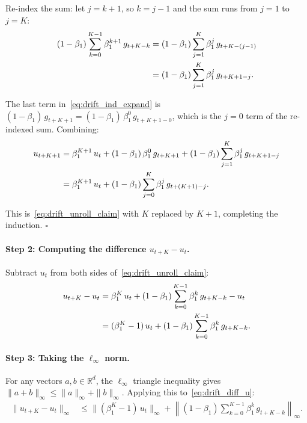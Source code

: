 \documentclass{article}
\begin{document}
Re-index the sum: let $j = k + 1$, so $k = j - 1$ and the sum runs
from $j = 1$ to $j = K$:
\begin{align}
(1-\beta_1)\sum_{k=0}^{K-1}\beta_1^{k+1}\,g_{t+K-k}
&= (1-\beta_1)\sum_{j=1}^{K}\beta_1^{j}\,g_{t+K-(j-1)} \notag \\
&= (1-\beta_1)\sum_{j=1}^{K}\beta_1^{j}\,g_{t+K+1-j}.
\label{eq:drift_reindex}
\end{align}

The last term in~\eqref{eq:drift_ind_expand} is
$(1-\beta_1)\,g_{t+K+1} = (1-\beta_1)\,\beta_1^0\,g_{t+K+1-0}$,
which is the $j = 0$ term of the re-indexed sum. Combining:
\begin{align}
u_{t+K+1}
&= \beta_1^{K+1}\,u_t
   + (1-\beta_1)\,\beta_1^0\,g_{t+K+1}
   + (1-\beta_1)\sum_{j=1}^{K}\beta_1^{j}\,g_{t+K+1-j} \notag \\
&= \beta_1^{K+1}\,u_t
   + (1-\beta_1)\sum_{j=0}^{K}\beta_1^{j}\,g_{t+(K+1)-j}.
\label{eq:drift_ind_done}
\end{align}

This is~\eqref{eq:drift_unroll_claim} with $K$ replaced by $K+1$,
completing the induction. \hfill$\square$

\paragraph{Step 2: Computing the difference $u_{t+K} - u_t$.}

Subtract $u_t$ from both sides of~\eqref{eq:drift_unroll_claim}:
\begin{align}
u_{t+K} - u_t
&= \beta_1^K\,u_t + (1-\beta_1)\sum_{k=0}^{K-1}\beta_1^k\,g_{t+K-k}
   - u_t \notag \\
&= (\beta_1^K - 1)\,u_t
   + (1-\beta_1)\sum_{k=0}^{K-1}\beta_1^k\,g_{t+K-k}.
\label{eq:drift_diff_u}
\end{align}

\paragraph{Step 3: Taking the $\ell_\infty$ norm.}

For any vectors $a, b \in \mathbb{R}^d$, the $\ell_\infty$ triangle
inequality gives $\|a + b\|_\infty \leq \|a\|_\infty + \|b\|_\infty$.
Applying this to~\eqref{eq:drift_diff_u}:
\begin{align}
\|u_{t+K} - u_t\|_\infty
&\leq \|(\beta_1^K - 1)\,u_t\|_\infty
   + \left\|(1-\beta_1)\sum_{k=0}^{K-1}\beta_1^k\,g_{t+K-k}\right\|_\infty.
\label{eq:drift_triangle_raw}
\end{align}
\end{document}
